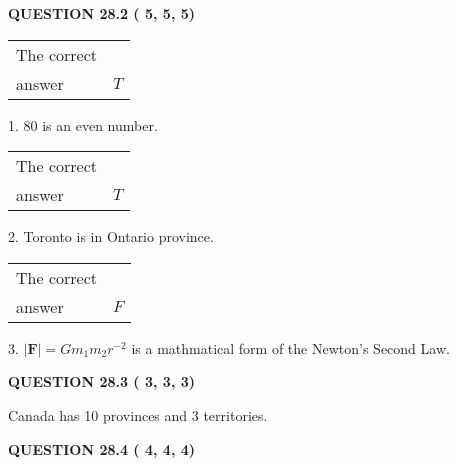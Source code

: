 \documentclass[12pt]{article}
\begin{document}
   
  
\vspace{0.2in}
  
{\textbf{\Large{QUESTION
28.2 
 (          5,          5,          5)
}}}
  
  
 
 
\noindent{}

 
\noindent\begin{tabular}{|l|l|}\hline The correct & \\
          answer &  %
$T$ \\ \hline \end{tabular}
1. $ %
80$ is an  %
even number.
 
\noindent\begin{tabular}{|l|l|}\hline The correct & \\
          answer &  %
$T$ \\ \hline \end{tabular}
2.  %
Toronto is in  %
Ontario province.
 
\noindent\begin{tabular}{|l|l|}\hline The correct & \\
          answer &  %
$F$ \\ \hline \end{tabular}
3.  %
$\left| \mathbf{F}\right| =Gm_1m_2r^{-2}$ is a mathmatical form of  %
the Newton's Second Law.
 
 
 
  
\vspace{0.2in}
  
{\textbf{\Large{QUESTION
28.3 
 (          3,          3,          3)
}}}
  
  
 
 
\noindent{}
 
 
Canada has  %
10 provinces and  %
3 territories.
 
 
 
 
  
\vspace{0.2in}
  
{\textbf{\Large{QUESTION
28.4 
 (          4,          4,          4)
}}}
  
  
 
 
\noindent{}
  
\end{document}
